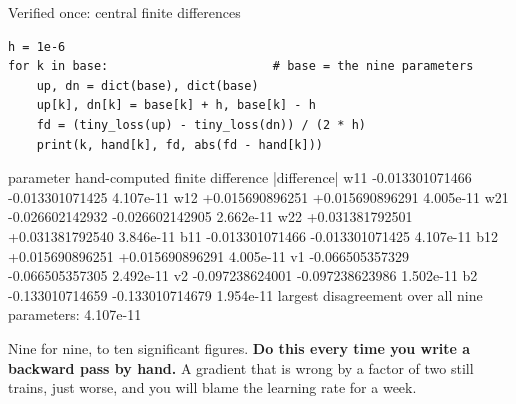 \documentclass[aspectratio=169]{beamer}
\begin{document}
\begin{frame}[fragile,shrink=8]{Verified once: central finite differences}
\begin{lstlisting}
h = 1e-6
for k in base:                       # base = the nine parameters
    up, dn = dict(base), dict(base)
    up[k], dn[k] = base[k] + h, base[k] - h
    fd = (tiny_loss(up) - tiny_loss(dn)) / (2 * h)
    print(k, hand[k], fd, abs(fd - hand[k]))
\end{lstlisting}
\begin{outblk}
parameter   hand-computed      finite difference    |difference|
   w11      -0.013301071466     -0.013301071425     4.107e-11
   w12      +0.015690896251     +0.015690896291     4.005e-11
   w21      -0.026602142932     -0.026602142905     2.662e-11
   w22      +0.031381792501     +0.031381792540     3.846e-11
   b11      -0.013301071466     -0.013301071425     4.107e-11
   b12      +0.015690896251     +0.015690896291     4.005e-11
   v1       -0.066505357329     -0.066505357305     2.492e-11
   v2       -0.097238624001     -0.097238623986     1.502e-11
   b2       -0.133010714659     -0.133010714679     1.954e-11
largest disagreement over all nine parameters: 4.107e-11
\end{outblk}
  \begin{center}\small
    Nine for nine, to ten significant figures. \textbf{Do this every time you
    write a backward pass by hand.} A gradient that is wrong by a factor of
    two still trains, just worse, and you will blame the learning rate for a
    week.
  \end{center}
\end{frame}
\end{document}
